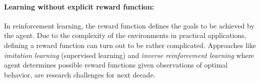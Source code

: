 \paragraph{Learning without explicit reward function:}
In reinforcement learning, the reward function defines the goals to
be achieved by the agent. Due to the complexity of the environments in practical
applications, defining a reward function can turn out to be rather
complicated. Approaches like {\em imitation learning} (supervised learning) and {\em inverse reinforcement learning} where agent determines possible reward functions given observations of optimal behavior, are research challenges for next decade.





